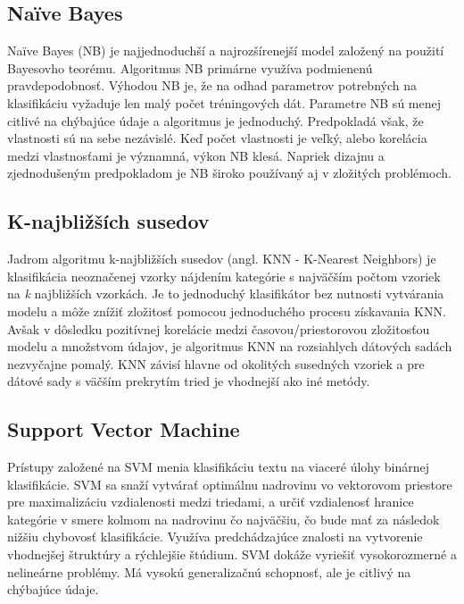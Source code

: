 \subsection*{Naïve Bayes}
Naïve Bayes (NB) je najjednoduchší a najrozšírenejší model založený na použití Bayesovho teorému. Algoritmus NB primárne využíva podmienenú pravdepodobnosť. Výhodou NB je, že na odhad parametrov potrebných na klasifikáciu vyžaduje len malý počet tréningových dát. Parametre NB sú menej citlivé na chýbajúce údaje a algoritmus je jednoduchý. Predpokladá však, že vlastnosti sú na sebe nezávislé. Keď počet vlastnosti je veľký, alebo korelácia medzi vlastnosťami je významná, výkon NB klesá. Napriek  dizajnu a zjednodušeným predpokladom je NB široko používaný aj v zložitých problémoch.

\subsection*{K-najbližších susedov}
Jadrom algoritmu k-najbližších susedov (angl. KNN - K-Nearest Neighbors) je klasifikácia neoznačenej vzorky nájdením kategórie s najväčším počtom vzoriek na \textit{k} najbližších vzorkách. Je to jednoduchý klasifikátor bez nutnosti vytvárania modelu a môže znížiť zložitosť pomocou jednoduchého procesu získavania KNN. Avšak v dôsledku pozitívnej korelácie medzi časovou/priestorovou zložitosťou modelu a množstvom údajov, je algoritmus KNN na rozsiahlych dátových sadách nezvyčajne pomalý. KNN závisí hlavne od okolitých susedných vzoriek a pre dátové sady s väčším prekrytím tried  je vhodnejší ako iné metódy.

\subsection*{Support Vector Machine}
Prístupy založené na SVM menia klasifikáciu textu na viaceré úlohy binárnej klasifikácie. SVM sa snaží vytvárať optimálnu nadrovinu vo vektorovom priestore pre maximalizáciu vzdialenosti medzi triedami, a určiť vzdialenosť hranice kategórie v smere kolmom na nadrovinu čo najväčšiu, čo bude mať za následok nižšiu chybovosť klasifikácie. Využíva predchádzajúce znalosti na vytvorenie vhodnejšej štruktúry a rýchlejšie štúdium. SVM dokáže vyriešiť vysokorozmerné a nelineárne problémy. Má vysokú generalizačnú schopnosť, ale je citlivý na chýbajúce údaje.

